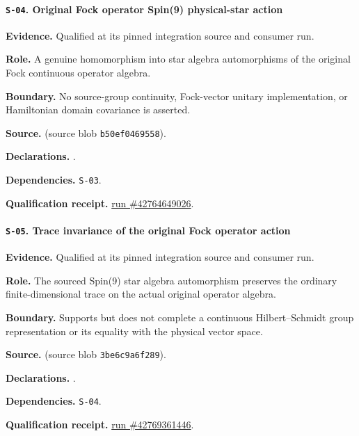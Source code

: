 \paragraph{\texttt{S-04}. Original Fock operator Spin(9) physical-star action}
\noindent\textbf{Evidence.} Qualified at its pinned integration source and consumer run.
\par\noindent\textbf{Role.} A genuine homomorphism into star algebra automorphisms of the original Fock continuous operator algebra.
\par\noindent\textbf{Boundary.} No source-group continuity, Fock-vector unitary implementation, or Hamiltonian domain covariance is asserted.
\par\noindent\textbf{Source.}  (source blob \texttt{b50ef0469558}).
\par\noindent\textbf{Declarations.} .
\par\noindent\textbf{Dependencies.} \texttt{S-03}.
\par\noindent\textbf{Qualification receipt.} \href{https://github.com/etblink/math/actions/runs/42764649026}{run \#42764649026}.
\medskip

\paragraph{\texttt{S-05}. Trace invariance of the original Fock operator action}
\noindent\textbf{Evidence.} Qualified at its pinned integration source and consumer run.
\par\noindent\textbf{Role.} The sourced Spin(9) star algebra automorphism preserves the ordinary finite-dimensional trace on the actual original operator algebra.
\par\noindent\textbf{Boundary.} Supports but does not complete a continuous Hilbert--Schmidt group representation or its equality with the physical vector space.
\par\noindent\textbf{Source.}  (source blob \texttt{3be6c9a6f289}).
\par\noindent\textbf{Declarations.} .
\par\noindent\textbf{Dependencies.} \texttt{S-04}.
\par\noindent\textbf{Qualification receipt.} \href{https://github.com/etblink/math/actions/runs/42769361446}{run \#42769361446}.
\medskip

